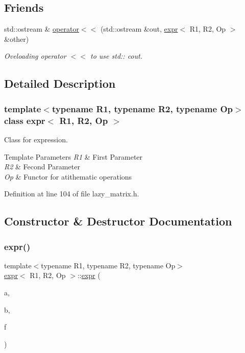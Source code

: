 \subsection*{Friends}
\begin{DoxyCompactItemize}
\item 
std\+::ostream \& \mbox{\hyperlink{classexpr_a2298d0a57665feadc1e35ac9df610dc8}{operator$<$$<$}} (std\+::ostream \&out, \mbox{\hyperlink{classexpr}{expr}}$<$ R1, R2, Op $>$ \&other)
\begin{DoxyCompactList}\small\item\em Oveloading operator $<$$<$ to use std\+:\+: cout. \end{DoxyCompactList}\end{DoxyCompactItemize}


\subsection{Detailed Description}
\subsubsection*{template$<$typename R1, typename R2, typename Op$>$\newline
class expr$<$ R1, R2, Op $>$}

Class for expression. 


\begin{DoxyTemplParams}{Template Parameters}
{\em R1} & First Parameter \\
\hline
{\em R2} & Fecond Parameter \\
\hline
{\em Op} & Functor for atithematic operations \\
\hline
\end{DoxyTemplParams}


Definition at line 104 of file lazy\+\_\+matrix.\+h.



\subsection{Constructor \& Destructor Documentation}
\mbox{\label{classexpr_a88ac75b254c2838f389ad61101abb7f4}} 
\subsubsection{\texorpdfstring{expr()}{expr()}}
{\footnotesize\ttfamily template$<$typename R1, typename R2, typename Op$>$ \\
\mbox{\hyperlink{classexpr}{expr}}$<$ R1, R2, Op $>$\+::\mbox{\hyperlink{classexpr}{expr}} (\begin{DoxyParamCaption}\item[{const R1 \&}]{a,  }\item[{const R2 \&}]{b,  }\item[{Op}]{f }\end{DoxyParamCaption})\hspace{0.3cm}{\ttfamily [inline]}}



